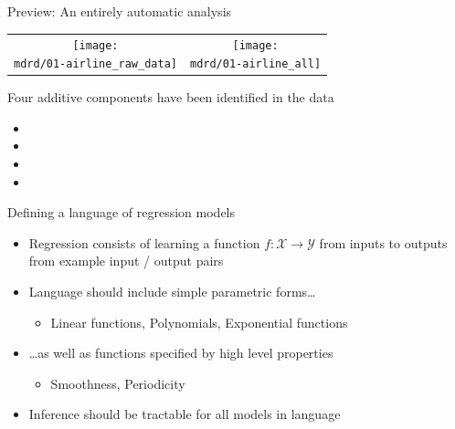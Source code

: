 \begin{frame}{Preview: An entirely automatic analysis}

\newcommand{\wmgd}{0.5\columnwidth}
\newcommand{\hmgd}{3.0cm}
\newcommand{\mdrd}{figures/01-airline}
\newcommand{\mbm}{\hspace{-0.3cm}}
\begin{tabular}{cc}
\mbm \texttt{[image: \\mdrd/01-airline\_raw\_data]} & \texttt{[image: \\mdrd/01-airline\_all]}
\end{tabular}
\vspace{0.5\baselineskip}

{\footnotesize
Four additive components have been identified in the data
\begin{itemize}

  \item  

  \item  

  \item  

  \item  

\end{itemize}
}
\end{frame}

\begin{frame}{Defining a language of regression models}
  \begin{itemize}
    \item Regression consists of learning a function $f: \mathcal{X} \to \mathcal{Y}$ from inputs to outputs from example input / output pairs
    \vspace{\baselineskip}
    \item Language should include simple parametric forms\ldots
    \begin{itemize}
       \item \eg Linear functions, Polynomials, Exponential functions
     \end{itemize}
    \vspace{\baselineskip}
    \item \ldots as well as functions specified by high level properties
    \begin{itemize}
       \item \eg Smoothness, Periodicity
     \end{itemize}
    \vspace{\baselineskip}
    \item Inference should be tractable for all models in language
  \end{itemize}
\end{frame}

